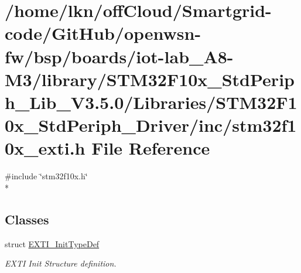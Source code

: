 \hypertarget{iot-lab___a8-_m3_2library_2_s_t_m32_f10x___std_periph___lib___v3_85_80_2_libraries_2_s_t_m32_f1002ce3d1238359062f0f14df005829a24}{}\section{/home/lkn/off\+Cloud/\+Smartgrid-\/code/\+Git\+Hub/openwsn-\/fw/bsp/boards/iot-\/lab\+\_\+\+A8-\/\+M3/library/\+S\+T\+M32\+F10x\+\_\+\+Std\+Periph\+\_\+\+Lib\+\_\+\+V3.5.0/\+Libraries/\+S\+T\+M32\+F10x\+\_\+\+Std\+Periph\+\_\+\+Driver/inc/stm32f10x\+\_\+exti.h File Reference}
\label{iot-lab___a8-_m3_2library_2_s_t_m32_f10x___std_periph___lib___v3_85_80_2_libraries_2_s_t_m32_f1002ce3d1238359062f0f14df005829a24}
{\ttfamily \#include \char`\"{}stm32f10x.\+h\char`\"{}}\\*
\subsection*{Classes}
\begin{DoxyCompactItemize}
\item 
struct \hyperlink{struct_e_x_t_i___init_type_def}{E\+X\+T\+I\+\_\+\+Init\+Type\+Def}
\begin{DoxyCompactList}\small\item\em E\+X\+TI Init Structure definition. \end{DoxyCompactList}\end{DoxyCompactItemize}
